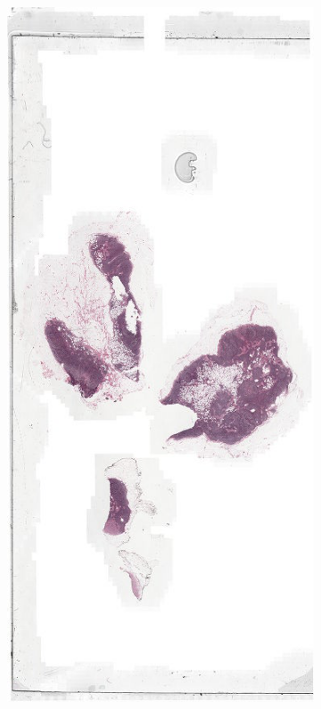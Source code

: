 \documentclass[a4paper,10pt]{article}
\begin{document}
\begin{figure}[!ht]
\centering
\begin{subfigure}{.33\textwidth}
  \centering
  \includegraphics[width=\linewidth]{Test_002_whole.png}

\end{subfigure}
\end{figure}
\end{document}
